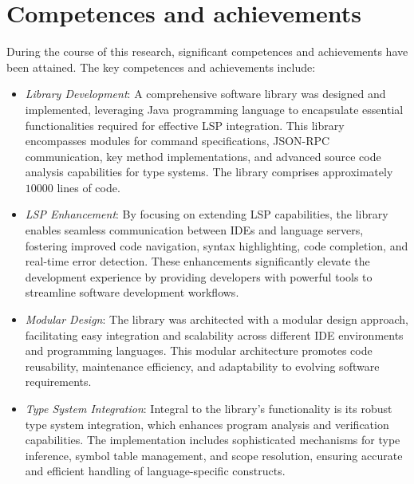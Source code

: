 \documentclass{adapt-lab}
\begin{document}
\section{Competences and achievements}

\vspace{0.5cm}

During the course of this research, significant competences and achievements have been attained. The key competences and achievements include:
\begin{itemize}
    \item \textit{Library Development}: A comprehensive software library was designed and implemented, leveraging Java programming language to encapsulate essential functionalities required for effective LSP integration. This library encompasses modules for command specifications, JSON-RPC communication, key method implementations, and advanced source code analysis capabilities for type systems. The library comprises approximately $10000$ lines of code.
    \item \textit{LSP Enhancement}: By focusing on extending LSP capabilities, the library enables seamless communication between IDEs and language servers, fostering improved code navigation, syntax highlighting, code completion, and real-time error detection. These enhancements significantly elevate the development experience by providing developers with powerful tools to streamline software development workflows.
    \item \textit{Modular Design}: The library was architected with a modular design approach, facilitating easy integration and scalability across different IDE environments and programming languages. This modular architecture promotes code reusability, maintenance efficiency, and adaptability to evolving software requirements.
    \item \textit{Type System Integration}: Integral to the library's functionality is its robust type system integration, which enhances program analysis and verification capabilities. The implementation includes sophisticated mechanisms for type inference, symbol table management, and scope resolution, ensuring accurate and efficient handling of language-specific constructs.

\end{itemize}
\end{document}
